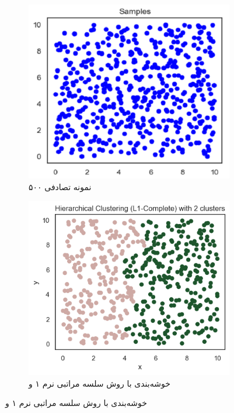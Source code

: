 \documentclass[a4paper, 12pt]{article}
\begin{document}
	\begin{figure}[H]
		\begin{subfigure}[t]{.4\textwidth}
			\centering
			\includegraphics[width=\linewidth]{fig1.png}
			\caption{
			۵۰۰
			نمونه تصادفی	
		}
		\end{subfigure}
		\hfill
		\begin{subfigure}[t]{.4\textwidth}
			\centering
			\includegraphics[width=\linewidth]{fig2.png}
			\caption{
			خوشه‌بندی با روش سلسه مراتبی نرم ۱ و 
		}
		\end{subfigure}
		

\end{figure}
\end{document}
